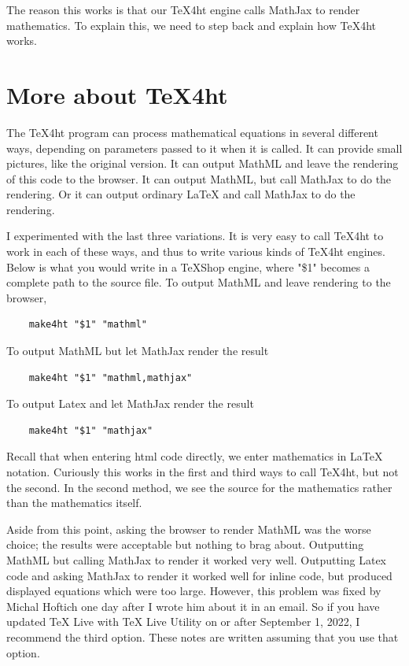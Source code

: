 \documentclass[11pt, oneside]{article}   	%
\begin{document}
The reason this works is that our TeX4ht engine calls MathJax to render mathematics. To explain this, we need to step back and explain how TeX4ht works.

\section{More about TeX4ht}

The TeX4ht program can process mathematical equations in several different ways, depending on parameters passed to it when it is called. It can provide small pictures, like the original version. It can output MathML and leave the rendering of this code to the browser. It can output MathML, but call MathJax to do the rendering. Or it can output ordinary LaTeX and call MathJax to do the rendering.

I experimented with the last three variations. It is very easy to call TeX4ht to work in each of these ways, and thus to write various kinds of TeX4ht engines. Below is what you would write in a TeXShop engine, where "\$1" becomes a complete path to the source file. To output MathML and leave rendering to the browser,
\begin{verbatim}
    make4ht "$1" "mathml"
\end{verbatim}
To output MathML but let MathJax render the result
\begin{verbatim}
    make4ht "$1" "mathml,mathjax"
\end{verbatim}
To output Latex and let MathJax render the result
\begin{verbatim}
    make4ht "$1" "mathjax"
\end{verbatim}

Recall that when entering html code directly, we enter mathematics in LaTeX notation. Curiously this works in the first and third ways to call TeX4ht, but not the second. In the second method, we see the source for the mathematics rather than the mathematics itself.

Aside from this point, asking the browser to render MathML was the worse choice; the results were acceptable but nothing to brag about. Outputting MathML but calling MathJax to render it worked very well. Outputting Latex code and asking MathJax to render it worked well for inline code, but produced displayed equations which were too large.
However, this problem was fixed by Michal Hoftich one day after I wrote him about it in an email. So if you have updated TeX Live with TeX Live Utility on or after September 1, 2022, I recommend the third option.  These notes are written assuming that you use that option.
\end{document}
